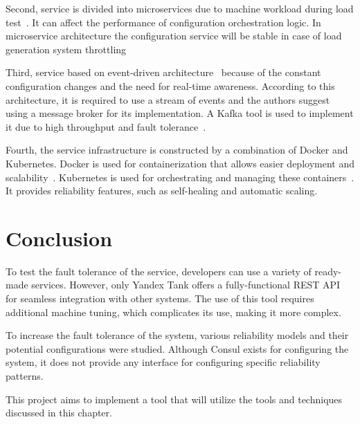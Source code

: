 Second, service is divided into microservices due to machine workload during load test~\cite{load_testing_tips}.
It can affect the performance of configuration orchestration logic.
In microservice architecture the configuration service will be stable in case of load generation system throttling

Third, service based on event-driven architecture~\cite{event_driven} because of the constant configuration changes and the need for real-time awareness.
According to this architecture, it is required to use a stream of events and the authors suggest using a message broker for its implementation.
A Kafka tool is used to implement it due to high throughput and fault tolerance~\cite{kafka_choose}.

Fourth, the service infrastructure is constructed by a combination of Docker and Kubernetes.
Docker is used for containerization that allows easier deployment and scalability~\cite{docker_start}.
Kubernetes is used for orchestrating and managing these containers~\cite{kubernetes}.
It provides reliability features, such as self-healing and automatic scaling.

\section{Conclusion}\label{sec:review_conclusion}
To test the fault tolerance of the service, developers can use a variety of ready-made services. However, only Yandex Tank offers a fully-functional REST API for seamless integration with other systems.
The use of this tool requires additional machine tuning, which complicates its use, making it more complex.

To increase the fault tolerance of the system, various reliability models and their potential configurations were studied.
Although Consul exists for configuring the system, it does not provide any interface for configuring specific reliability patterns.

This project aims to implement a tool that will utilize the tools and techniques discussed in this chapter.